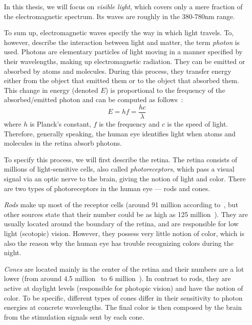 In this thesis, we will focus on \emph{visible light}, which covers only a mere fraction of the electromagnetic spectrum. Its waves are roughly in the 380-780nm range.

To sum up, electromagnetic waves specify the way in which light travels. To, however, describe the interaction between light and matter, the term \emph{photon} is used. Photons are elementary particles of light moving in a manner specified by their wavelengths, making up electromagnetic radiation. They can be emitted or absorbed by atoms and molecules. During this process, they transfer energy either from the object that emitted them or to the object that absorbed them. This change in energy (denoted $E$) is proportional to the frequency of the absorbed/emitted photon and can be computed as follows~\citep{planckConstant}: 
\begin{equation} \label{energyEquation}
E = hf = \dfrac{hc}{\lambda}
\end{equation}
where $h$ is Planck's constant, $f$ is the frequency and $c$ is the speed of light. Therefore, generally speaking, the human eye identifies light when atoms and molecules in the retina absorb photons. 

To specify this process, we will first describe the retina. The retina consists of millions of light-sensitive cells, also called \emph{photoreceptors}, which pass a visual signal via an optic nerve to the brain, giving the notion of light and color. There are two types of photoreceptors in the human eye --- rods and cones.

\emph{Rods} make up most of the receptor cells (around 91 million according to~\citet{rods91cones4f5}, but other sources state that their number could be as high as 125 million~\cite{rods125cones6}). They are usually located around the boundary of the retina, and are responsible for low light (scotopic) vision. However, they possess very little notion of color, which is also the reason why the human eye has trouble recognizing colors during the night.

\emph{Cones} are located mainly in the center of the retina and their numbers are a lot lower (from around 4.5 million~\cite{rods91cones4f5} to 6 million~\cite{rods125cones6}). In contrast to rods, they are active at daylight levels (responsible for photopic vision) and have the notion of color. To be specific, different types of cones differ in their sensitivity to photon energies at concrete wavelengths. The final color is then composed by the brain from the stimulation signals sent by each cone.

